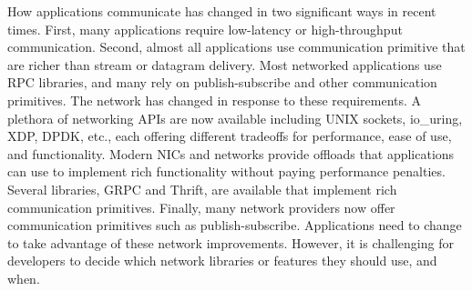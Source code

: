\begin{outline}
\0 How applications communicate has changed in two significant ways in recent times.
    \1 First, many applications require low-latency or high-throughput communication.
    \1 Second, almost all applications use communication primitive that are richer than stream or datagram delivery. Most networked applications use RPC libraries, and many rely on publish-subscribe and other communication primitives.
\0 The network has changed in response to these requirements.
    \1 A plethora of networking APIs are now available including UNIX sockets, io\_uring, XDP, DPDK, etc., each offering different tradeoffs for performance, ease of use, and functionality.
    \1 Modern NICs and networks provide offloads that applications can use to implement rich functionality without paying performance penalties.
    \1 Several libraries, \eg GRPC and Thrift, are available that implement rich communication primitives.
    \1 Finally, many network providers now offer communication primitives such as publish-subscribe.
\0 Applications need to change to take advantage of these network improvements.
    \1 However, it is challenging for developers to decide which network libraries or features they should use, and when.

\end{outline}
